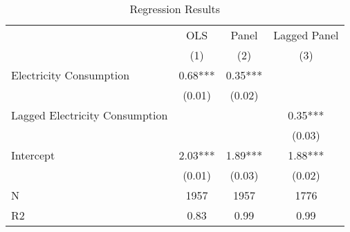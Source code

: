 \begin{table}
\caption{Regression Results}
\label{results}
\begin{center}
\begin{tabular}{lccc}
\hline
          &   OLS   &  Panel  & Lagged Panel  \\
          &   (1)   &   (2)   &     (3)       \\
\midrule
\midrule
Electricity Consumption     & 0.68*** & 0.35*** &               \\
          & (0.01)  & (0.02)  &               \\
Lagged Electricity Consumption  &         &         & 0.35***       \\
          &         &         & (0.03)        \\
Intercept & 2.03*** & 1.89*** & 1.88***       \\
          & (0.01)  & (0.03)  & (0.02)        \\
\midrule
N         & 1957    & 1957    & 1776          \\
R2        & 0.83    & 0.99    & 0.99          \\
\hline
\end{tabular}
\end{center}
\end{table}